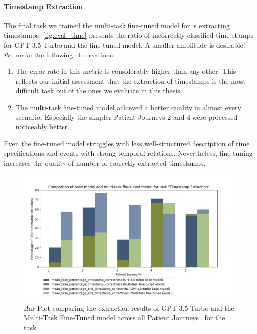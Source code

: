 \paragraph{Timestamp Extraction}
The final task we trained the multi-task fine-tuned model for is extracting timestamps. \autoref{fig:eval_time} presents the ratio of incorrectly classified time stamps for GPT-3.5 Turbo and the fine-tuned model. A smaller amplitude is desirable. We make the following observations:
\begin{enumerate}
    \item The error rate in this metric is considerably higher than any other. This reflects our initial assessment that the extraction of timestamps is the most difficult task out of the ones we evaluate in this thesis.
    \item The multi-task fine-tuned model achieved a better quality in almost every scenario. Especially the simpler Patient Journeys 2 and 4 were processed noticeably better.
\end{enumerate}
Even the fine-tuned model struggles with less well-structured description of time specifications and events with strong temporal relations. Nevertheless, fine-tuning increases the quality of number of correctly extracted timestamps.
\begin{figure}[h]
    \centering
    \captionsetup{belowskip=0pt,aboveskip=0pt}
    \includegraphics[width=\textwidth]{bachelor_thesis/images/timestamp_all_sorted.png}
    \caption{Bar Plot comparing the extraction results of GPT-3.5 Turbo and the Multi-Task Fine-Tuned model across all Patient Journeys~ for the task }
    \label{fig:eval_time}
\end{figure}


